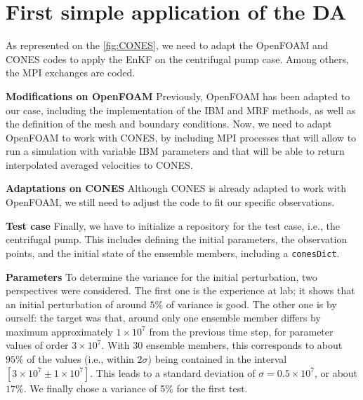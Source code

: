 


\section{First simple application of the DA}
\label{sec:Application_of_the_DA}

As represented on the \autoref{fig:CONES}, we need to adapt the OpenFOAM and CONES codes to apply the EnKF on the centrifugal pump case. Among others, the MPI exchanges are coded.

\textbf{Modifications on OpenFOAM}
Previously, OpenFOAM has been adapted to our case, including the implementation of the IBM and MRF methods, as well as the definition of the mesh and boundary conditions. Now, we need to adapt OpenFOAM to work with CONES, by including MPI processes that will allow to run a simulation with variable IBM parameters and that will be able to return interpolated averaged velocities to CONES.

\textbf{Adaptations on CONES}
Although CONES is already adapted to work with OpenFOAM, we still need to adjust the code to fit our specific observations.

\textbf{Test case}
Finally, we have to initialize a repository for the test case, i.e., the centrifugal pump. This includes defining the initial parameters, the observation points, and the initial state of the ensemble members, including a \texttt{conesDict}.


\textbf{Parameters} To determine the variance for the initial perturbation, two perspectives were considered. The first one is the experience at lab; it shows that an initial perturbation of around $5\%$ of variance is good. The other one is by ourself: the target was that, around only one ensemble member differs by maximum approximately $1 \times 10^7$ from the previous time step, for parameter values of order $3 \times 10^7$. With 30 ensemble members, this corresponds to about $95\%$ of the values (i.e., within $2\sigma$) being contained in the interval $[3 \times 10^7 \pm 1 \times 10^7]$. This leads to a standard deviation of $\sigma = 0.5 \times 10^7$, or about $17\%$. We finally chose a variance of 5\% for the first test.

